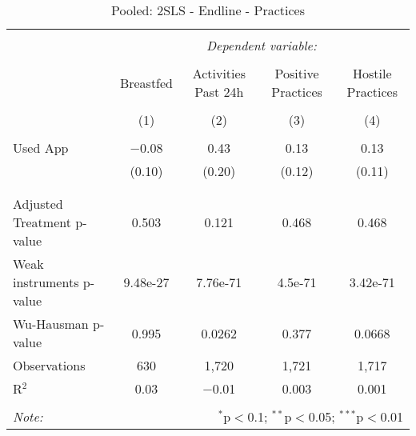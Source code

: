 
\begin{table}[!htbp] \centering 
  \caption{Pooled: 2SLS - Endline - Practices} 
  \label{tbl:Pooled: 2SLS - Endline - Practices} 
\begin{tabular}{@{\extracolsep{5pt}}lcccc} 
\\[-1.8ex]\hline 
\hline \\[-1.8ex] 
 & \multicolumn{4}{c}{\textit{Dependent variable:}} \\ 
\cline{2-5} 
\\[-1.8ex] & Breastfed & Activities Past 24h & Positive Practices & Hostile Practices \\ 
\\[-1.8ex] & (1) & (2) & (3) & (4)\\ 
\hline \\[-1.8ex] 
 Used App & $-$0.08 & 0.43 & 0.13 & 0.13 \\ 
  & (0.10) & (0.20) & (0.12) & (0.11) \\ 
  & & & & \\ 
\hline \\[-1.8ex] 
Adjusted Treatment p-value & 0.503 & 0.121 & 0.468 & 0.468 \\ 
Weak instruments p-value & 9.48e-27 & 7.76e-71 & 4.5e-71 & 3.42e-71 \\ 
Wu-Hausman p-value & 0.995 & 0.0262 & 0.377 & 0.0668 \\ 
Observations & 630 & 1,720 & 1,721 & 1,717 \\ 
R$^{2}$ & 0.03 & $-$0.01 & 0.003 & 0.001 \\ 
\hline 
\hline \\[-1.8ex] 
\textit{Note:}  & \multicolumn{4}{r}{$^{*}$p$<$0.1; $^{**}$p$<$0.05; $^{***}$p$<$0.01} \\ 
\end{tabular} 
\end{table} 
